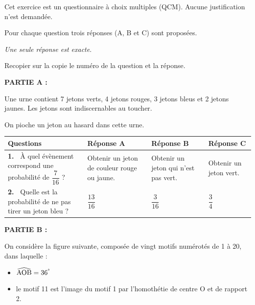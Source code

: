 \documentclass[exercice,a4]{thedocument}%
\begin{document}
%
\def\degres{\textsuperscript{\textdegree}}%

\medskip

Cet exercice est un questionnaire à choix multiples (QCM). Aucune justification n'est demandée.

Pour chaque question trois réponses (A, B et C) sont proposées.

\emph{Une seule réponse est exacte}.

Recopier sur la copie le numéro de la question et la réponse.

\bigskip

\textbf{PARTIE A :}

\medskip

Une urne contient 7 jetons verts, 4 jetons rouges, 3 jetons bleus et 2 jetons jaunes. Les jetons sont indiscernables au toucher.

On pioche un jeton au hasard dans cette urne.

\begin{center}
\begin{tabularx}{\linewidth}{|m{3.25cm}|*{3}{X|}}\hline
\textbf{Questions}&\textbf{Réponse A}&\textbf{Réponse B}&\textbf{Réponse C}\\ \hline
\textbf{1.~} À quel évènement correspond une probabilité de $\dfrac{7}{16}$ ?&Obtenir un jeton de couleur rouge ou jaune.&Obtenir un jeton qui n'est pas vert.&Obtenir un jeton vert.\\ \hline
\textbf{2.~} Quelle est la probabilité de ne pas tirer un jeton
bleu ?& \qquad \qquad$\dfrac{13}{16}$ &\qquad  \qquad$\dfrac{3}{16}$ &\qquad  \qquad$\dfrac{3}{4}$\\ \hline
\end{tabularx}
\end{center}

\bigskip

\textbf{PARTIE B :}

\medskip

On considère la figure suivante, composée de vingt motifs numérotés de 1 à 20, dans laquelle :

\setlength\parindent{9mm}
\begin{itemize}
\item[$\bullet~~$] $\widehat{\text{AOB}} =  36\degres$
\item[$\bullet~~$] le motif 11 est l'image du motif 1 par l'homothétie de centre O et de rapport 2.
\end{itemize}
\setlength\parindent{0mm}
\end{document}
